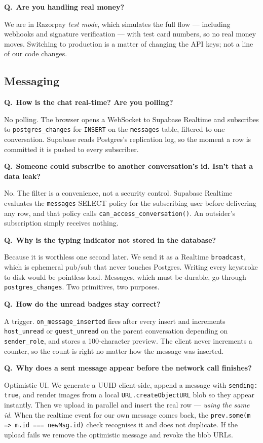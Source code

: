 \documentclass[11pt,a4paper]{article}
\newcommand{\Q}[1]{\vspace{7pt}\noindent\textbf{\color{primary}Q.}~\textbf{#1}\par\vspace{1pt}}
\newcommand{\A}[1]{\noindent #1\par}
\begin{document}
\Q{Are you handling real money?}
\A{We are in Razorpay \emph{test mode}, which simulates the full flow --- including
webhooks and signature verification --- with test card numbers, so no real money
moves. Switching to production is a matter of changing the API keys; not a line of
our code changes.}

\subsection{Messaging}

\Q{How is the chat real-time? Are you polling?}
\A{No polling. The browser opens a WebSocket to Supabase Realtime and subscribes to
\texttt{postgres\_changes} for \texttt{INSERT} on the \texttt{messages} table,
filtered to one conversation. Supabase reads Postgres's replication log, so the
moment a row is committed it is pushed to every subscriber.}

\Q{Someone could subscribe to another conversation's id. Isn't that a data leak?}
\A{No. The filter is a convenience, not a security control. Supabase Realtime
evaluates the \texttt{messages} SELECT policy for the subscribing user before
delivering any row, and that policy calls \texttt{can\_access\_conversation()}. An
outsider's subscription simply receives nothing.}

\Q{Why is the typing indicator not stored in the database?}
\A{Because it is worthless one second later. We send it as a Realtime
\texttt{broadcast}, which is ephemeral pub/sub that never touches Postgres.
Writing every keystroke to disk would be pointless load. Messages, which must be
durable, go through \texttt{postgres\_changes}. Two primitives, two purposes.}

\Q{How do the unread badges stay correct?}
\A{A trigger. \texttt{on\_message\_inserted} fires after every insert and increments
\texttt{host\_unread} or \texttt{guest\_unread} on the parent conversation depending
on \texttt{sender\_role}, and stores a 100-character preview. The client never
increments a counter, so the count is right no matter how the message was inserted.}

\Q{Why does a sent message appear before the network call finishes?}
\A{Optimistic UI. We generate a UUID client-side, append a message with
\texttt{sending: true}, and render images from a local
\texttt{URL.createObjectURL} blob so they appear instantly. Then we upload in
parallel and insert the real row --- \emph{using the same id}. When the realtime
event for our own message comes back, the \texttt{prev.some(m => m.id ===
newMsg.id)} check recognises it and does not duplicate. If the upload fails we
remove the optimistic message and revoke the blob URLs.}
\end{document}
